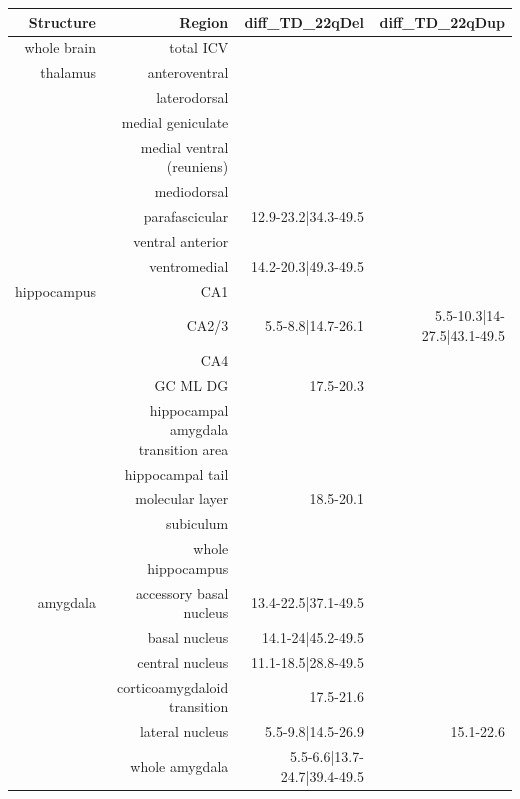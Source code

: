 \documentclass[
]{article}
\begin{document}
\begin{longtable}{rrrr}
\toprule
Structure & Region & diff\_TD\_22qDel & diff\_TD\_22qDup \\ 
\midrule\addlinespace[2.5pt]
whole brain & total ICV &  &  \\ 
thalamus & anteroventral &  &  \\ 
 & laterodorsal &  &  \\ 
 & medial geniculate &  &  \\ 
 & medial ventral (reuniens) &  &  \\ 
 & mediodorsal &  &  \\ 
 & parafascicular & 12.9-23.2|34.3-49.5 &  \\ 
 & ventral anterior &  &  \\ 
 & ventromedial & 14.2-20.3|49.3-49.5 &  \\ 
hippocampus & CA1 &  &  \\ 
 & CA2/3 & 5.5-8.8|14.7-26.1 & 5.5-10.3|14-27.5|43.1-49.5 \\ 
 & CA4 &  &  \\ 
 & GC ML DG & 17.5-20.3 &  \\ 
 & hippocampal amygdala transition area &  &  \\ 
 & hippocampal tail &  &  \\ 
 & molecular layer & 18.5-20.1 &  \\ 
 & subiculum &  &  \\ 
 & whole hippocampus &  &  \\ 
amygdala & accessory basal nucleus & 13.4-22.5|37.1-49.5 &  \\ 
 & basal nucleus & 14.1-24|45.2-49.5 &  \\ 
 & central nucleus & 11.1-18.5|28.8-49.5 &  \\ 
 & corticoamygdaloid transition & 17.5-21.6 &  \\ 
 & lateral nucleus & 5.5-9.8|14.5-26.9 & 15.1-22.6 \\ 
 & whole amygdala & 5.5-6.6|13.7-24.7|39.4-49.5 &  \\ 
\bottomrule
\end{longtable}
\end{document}
